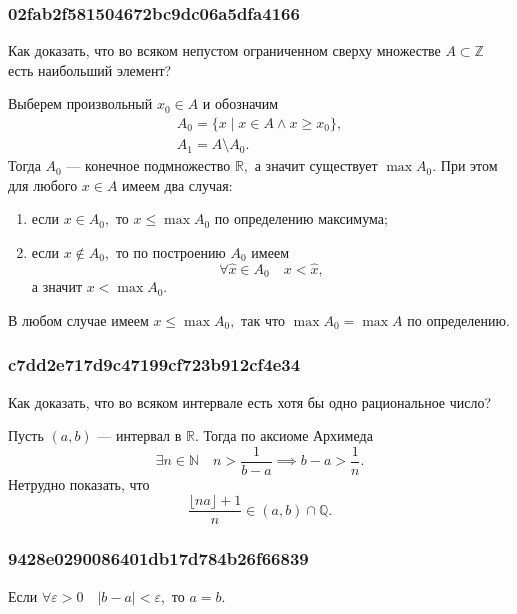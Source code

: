 \documentclass[11pt, a5paper]{article}
\newenvironment{note}[1]{\goodbreak\par\subsubsection{\hfill \color{lightgray}\tiny #1}}{}
\newenvironment{cloze}[2][\ldots]{\begin{leftbar}}{\end{leftbar}}
\newenvironment{icloze}[2][\ldots]{\ignorespaces}{\unskip}
\begin{document}
    \begin{note}{02fab2f581504672bc9dc06a5dfa4166}
        Как доказать, что во всяком непустом ограниченном сверху множестве \( A
        \subset \mathbb Z \) есть наибольший элемент?

        \begin{cloze}{1}
            Выберем произвольный \( x_0 \in A \) и обозначим \[
                \begin{gathered}
                    A_0 = \{ x \mid x \in A \land x \geqslant x_0 \},  \\
                    A_1 = A \setminus A_0.
                \end{gathered}
            \]
            Тогда \( A_0 \) --- конечное подмножество \( \mathbb R, \) а значит
            существует \( \max A_0. \) При этом для любого \( x \in A \) имеем
            два случая:
            \begin{enumerate}
                \item если \( x \in A_0,  \) то \( x \leqslant \max A_0 \) по
                    определению максимума;
                \item если \( x \not\in A_0,  \) то по построению \( A_0 \)
                    имеем \[ \forall \hat{x} \in A_0 \quad x < \hat{x}, \] а
                    значит \( x < \max A_0. \)
            \end{enumerate}

            В любом случае имеем \( x \leqslant \max A_0, \) так что \( \max A_0
            = \max A \) по определению.
        \end{cloze}
    \end{note}

    \begin{note}{c7dd2e717d9c47199cf723b912cf4e34}
        Как доказать, что во всяком интервале есть хотя бы одно рациональное
        число?

        \begin{cloze}{1}
            Пусть \( (a, b) \) --- интервал в \( \mathbb R. \) Тогда по аксиоме
            Архимеда \[
               \exists n \in \mathbb N \quad n > \frac{1}{b - a} \implies b - a
               > \frac{1}{n}.
            \] Нетрудно показать, что \[
                \dfrac{\lfloor na \rfloor + 1}{n} \in (a, b) \cap \mathbb Q .
            \]
        \end{cloze}
    \end{note}

    \begin{note}{9428e0290086401db17d784b26f66839}
        Если \( \forall \varepsilon > 0 \quad |b - a| < \varepsilon, \) то
        \begin{icloze}{1}\( a = b. \)\end{icloze}
    \end{note}
\end{document}
